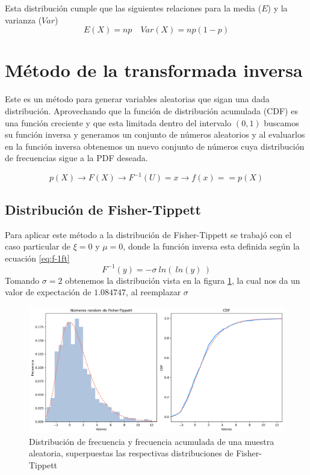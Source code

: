 \documentclass[baaa]{baaa}
\begin{document}
Esta distribución cumple que las siguientes relaciones para la media ($E$) y la varianza ($Var$)
\[E(X) = np \quad Var(X) = np(1 - p)\]

\section{Método de la transformada inversa}
Este es un método para generar variables aleatorias que sigan una dada distribución.
Aprovechando que la función de distribución acumulada (CDF) es una función creciente y que esta limitada dentro del intervalo $(0,1)$ buscamos su función inversa y generamos un conjunto de números aleatorios y al evaluarlos en la función inversa obtenemos un nuevo conjunto de números cuya distribución de frecuencias sigue a la PDF deseada.

\[
p(X) \to F(X) \to F^{-1}(U)=x \to f(x)==p(X)
\]

\subsection{Distribución de Fisher-Tippett}
Para aplicar este método a la distribución de Fisher-Tippett se trabajó con el caso particular de $\xi=0$ y $\mu=0$, donde la función inversa esta definida según la ecuación \ref{eq:f-1ft}
\begin{equation}
    F^{-1}(y)=-\sigma\:ln(\:ln(y)\:)
\label{eq:f-1ft}
\end{equation}
Tomando $\sigma=2$ obtenemos la distribución vista en la figura \ref{fig:ftanalisis}, la cual nos da un valor de expectación de $1.084747$, al reemplazar $\sigma$ 
\begin{figure}[h]
    \centering
    \includegraphics[width=\linewidth]{imagenes/ft_analysis.png}
    \caption{Distribución de frecuencia y frecuencia acumulada de una muestra aleatoria, superpuestas las respectivas distribuciones de Fisher-Tippett }
    \label{fig:ftanalisis}
\end{figure}
\end{document}
